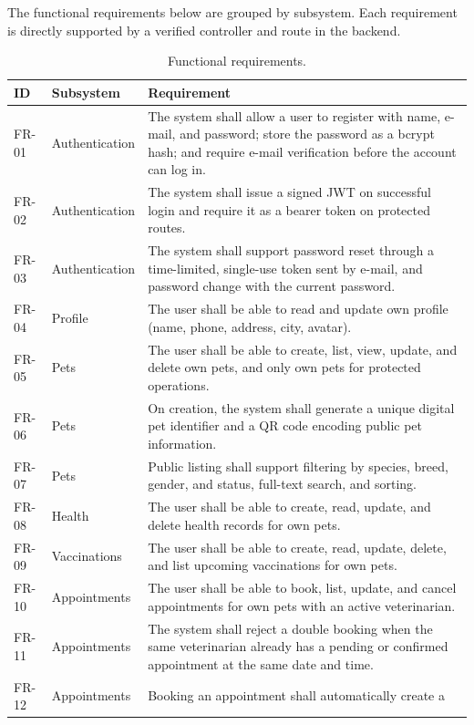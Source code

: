 The functional requirements below are grouped by subsystem. Each requirement is
directly supported by a verified controller and route in the backend.

\begin{center}
\begin{longtable}{@{}p{1.1cm}p{3.4cm}p{10.0cm}@{}}
\caption{Functional requirements.}
\label{tab:fr}\\
\toprule
\textbf{ID} & \textbf{Subsystem} & \textbf{Requirement} \\
\midrule
FR-01 & Authentication & The system shall allow a user to register with name,
e-mail, and password; store the password as a bcrypt hash; and require e-mail
verification before the account can log in. \\
FR-02 & Authentication & The system shall issue a signed JWT on successful
login and require it as a bearer token on protected routes. \\
FR-03 & Authentication & The system shall support password reset through a
time-limited, single-use token sent by e-mail, and password change with the
current password. \\
FR-04 & Profile & The user shall be able to read and update own profile
(name, phone, address, city, avatar). \\
FR-05 & Pets & The user shall be able to create, list, view, update, and delete
own pets, and only own pets for protected operations. \\
FR-06 & Pets & On creation, the system shall generate a unique digital pet
identifier and a QR code encoding public pet information. \\
FR-07 & Pets & Public listing shall support filtering by species, breed,
gender, and status, full-text search, and sorting. \\
FR-08 & Health & The user shall be able to create, read, update, and delete
health records for own pets. \\
FR-09 & Vaccinations & The user shall be able to create, read, update, delete,
and list upcoming vaccinations for own pets. \\
FR-10 & Appointments & The user shall be able to book, list, update, and cancel
appointments for own pets with an active veterinarian. \\
FR-11 & Appointments & The system shall reject a double booking when the same
veterinarian already has a pending or confirmed appointment at the same
date and time. \\
FR-12 & Appointments & Booking an appointment shall automatically create a

\end{longtable}
\end{center}
